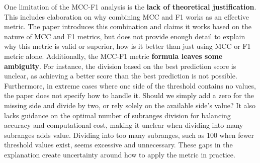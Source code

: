 \documentclass[12pt, oneside]{amsart}
\theoremstyle{definition}
\theoremstyle{remark}
\numberwithin{equation}{section}
\begin{document}
One limitation of the MCC-F1 analysis is the \textbf{lack of theoretical justification}. This includes elaboration on why combining MCC and F1 works as an effective metric. The paper introduces this combination and claims it works based on the nature of MCC and F1 metrics, but does not provide enough detail to explain why this metric is valid or superior, how is it better than just using MCC or F1 metric alone. Additionally, the MCC-F1 metric \textbf{formula leaves some ambiguity}. For instance, the division based on the best prediction score is unclear, as achieving a better score than the best prediction is not possible. Furthermore, in extreme cases where one side of the threshold contains no values, the paper does not specify how to handle it. Should we simply add a zero for the missing side and divide by two, or rely solely on the available side's value? It also lacks guidance on the optimal number of subranges division for balancing accuracy and computational cost, making it unclear when dividing into many subranges adds value. Dividing into too many subranges, such as 100 when fewer threshold values exist, seems excessive and unnecessary. These gaps in the explanation create uncertainty around how to apply the metric in practice.\\
\end{document}
